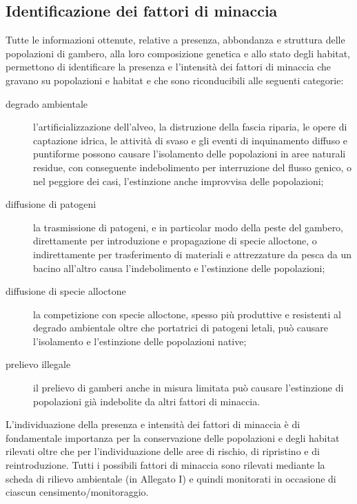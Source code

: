 \documentclass[11pt,a4paper,italian,twoside,openany]{memoir}
\begin{document}
\subsection{Identificazione dei fattori di minaccia} 
\label{sub_identific_min}
Tutte le informazioni ottenute, relative a presenza, abbondanza e struttura delle popolazioni di gambero, alla loro composizione genetica e allo stato degli habitat, permettono di identificare la presenza e l'intensità dei fattori di minaccia che gravano su popolazioni e habitat e che sono riconducibili alle seguenti categorie:
\begin{description}
  \item[degrado ambientale] l'artificializzazione dell'alveo, la distruzione della fascia riparia, le opere di captazione idrica, le attività di svaso e gli eventi di inquinamento diffuso e puntiforme possono causare l'isolamento delle popolazioni in aree naturali residue, con conseguente indebolimento per interruzione del flusso genico, o nel peggiore dei casi, l'estinzione anche improvvisa delle popolazioni; 
  \item[diffusione di patogeni] la trasmissione di patogeni, e in particolar modo della peste del gambero, direttamente per introduzione e propagazione di specie alloctone, o indirettamente per trasferimento di materiali e attrezzature da pesca da un bacino all'altro causa l'indebolimento e l'estinzione delle popolazioni;
  \item[diffusione di specie alloctone] la competizione con specie alloctone, spesso più produttive e resistenti al degrado ambientale oltre che portatrici di patogeni letali, può causare l'isolamento e l'estinzione delle popolazioni native; 
  \item[prelievo illegale] il prelievo di gamberi anche in misura limitata può causare l'estinzione di popolazioni già indebolite da altri fattori di minaccia.
\end{description}

L'individuazione della presenza e intensità dei fattori di minaccia è di fondamentale importanza per la conservazione delle popolazioni e degli habitat rilevati oltre che per l'individuazione delle aree di rischio, di ripristino e di reintroduzione. Tutti i possibili fattori di minaccia sono rilevati mediante la scheda di rilievo ambientale (in Allegato I) e quindi monitorati in occasione di ciascun censimento/monitoraggio. 
\end{document}
